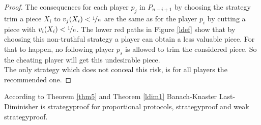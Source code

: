 \begin{proof}
\newline
The consequences for each player $p_j$ in $P_{n-i+1}$ by choosing the strategy trim a piece $X_i$ to $v_j(X_i)<\nicefrac{1}{n}$ are the same as for the player $p_i$ by cutting a piece with $v_i(X_i)<\nicefrac{1}{n}$. The lower red paths in Figure \ref{ldef} show that by choosing this non-truthful strategy a player can obtain a less valuable piece. For that to happen, no following player $p_s$ is allowed to trim the considered piece. So the cheating player will get this undesirable piece.
\\
\newline
The only strategy which does not conceal this risk, is for all players the recommended one.
\end{proof}
\begin{bezeichnungen}
According to Theorem \ref{thm5} and Theorem \ref{ldim1}%
Banach-Knaster Last-Diminisher is strategyproof for proportional protocols, strategyproof%
 and weak strategyproof.
\end{bezeichnungen}

\newpage
